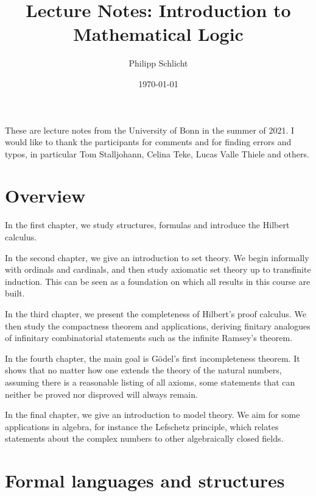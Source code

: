 \documentclass[a4paper, 11pt]{amsart}
\author{Philipp Schlicht}
\date{\today}
\title{Lecture Notes: Introduction to Mathematical Logic}
\theoremstyle{remark}
\begin{document}

\maketitle



\tableofcontents


These are lecture notes from the University of Bonn in the summer of 2021. 
I would like to thank the participants for comments and for finding errors and typos, in particular Tom Stalljohann, Celina Teke, Lucas Valle Thiele and others. 


\section*{Overview} 

In the first chapter, we study structures, formulas and introduce the Hilbert calculus. 

In the second chapter, we give an introduction to set theory. We begin informally with ordinals and cardinals, and then study axiomatic set theory up to transfinite induction. 
This can be seen as a foundation on which all results in this course are built. 

In the third chapter, we present the completeness of Hilbert's proof calculus. 
We then study the compactness theorem and applications, deriving finitary analogues of infinitary combinatorial statements such as the infinite Ramsey's theorem. 

In the fourth chapter, the main goal is G\"odel's first incompleteness theorem. 
It shows that no matter how one extends the theory of the natural numbers, assuming there is a reasonable listing of all axioms, some statements that can neither be proved nor disproved will always remain. 

In the final chapter, we give an introduction to model theory. 
We aim for some applications in algebra, for instance the Lefschetz principle, which relates statements about the complex numbers to other algebraically closed fields. 




\section{Formal languages and structures} 
\label{section languages and structures} 
\end{document}
